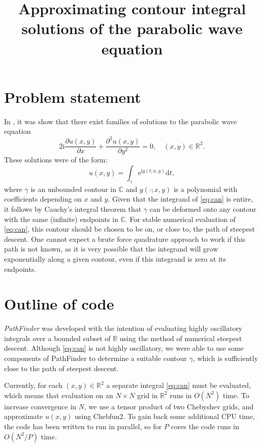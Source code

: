 \documentclass[12pt]{article}
\newcommand{\dd}{\mathrm{d}}
\newcommand{\imag}{\mathrm{i}}
\newcommand{\e}{\mathrm{e}}
\newcommand{\R}{\mathbb{R}}
\newcommand{\C}{\mathbb{C}}
\begin{document}
	\title{Approximating contour integral solutions of the parabolic wave equation}
	\maketitle
	
	\section{Problem statement}
	
	In \cite{DavePaper}, it was show that there exist families of solutions to the parabolic wave equation
	\[
	2\imag \frac{\partial u(x,y)}{\partial x} + \frac{\partial^2 u(x,y)}{\partial y^2} = 0,\quad (x,y)\in\R^2.
	\]
	These solutions were of the form:
	\begin{equation}\label{eq:can}
	u(x,y) = \int_\gamma \e^{\imag g(t;x,y)}\dd{t},
	\end{equation}
	where $\gamma$ is an unbounded contour in $\C$ and $g(\cdot;x,y)$ is a polynomial with coefficients depending on $x$ and $y$. Given that the integrand of \eqref{eq:can} is entire, it follows by Cauchy's integral theorem that $\gamma$ can be deformed onto any contour with the same (infinite) endpoints in $\C$. For stable numerical evaluation of \eqref{eq:can}, this contour should be chosen to be on, or close to, the path of steepest descent. One cannot expect a brute force quadrature approach to work if this path is not known, as it is very possible that the integrand will grow exponentially along a given contour, even if this integrand is zero at its endpoints.
	
	\section{Outline of code}
	
	\emph{PathFinder} was developed with the intention of evaluating highly oscillatory integrals over a bounded subset of $\R$ using the method of numerical steepest descent. Although \eqref{eq:can} is not highly oscillatory, we were able to use some components of PathFinder to determine a suitable contour $\gamma$, which is sufficiently close to the path of steepest descent.
	
	Currently, for each $(x,y)\in\R^2$ a separate integral \eqref{eq:can} must be evaluated, which means that evaluation on an $N\times N$ grid in $\R^2$ runs in $O(N^2)$ time. To increase convergence in $N$, we use a tensor product of two Chebyshev grids, and approximate $u(x,y)$ using Chebfun2. To gain back some additional CPU time, the code has been written to run in parallel, so for $P$ cores the code runs in $O(N^2/P)$ time.
	
\end{document}
